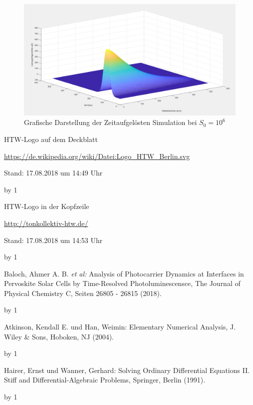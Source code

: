 \documentclass[
	pagesize,
	fontsize=12pt,
	paper=a4,
	oneside,
   reqno
]{scrartcl}
\begin{document}
\begin{figure}[H]
   \centering
   \includegraphics[width=1\textwidth]{Bilder/Aufgabe_4_4_6.png}
   \caption[Lösung bei $S_0 = 10^6$]{Grafische Darstellung der Zeitaufgelösten Simulation bei $S_0 = 10^6$}
   \label{fig:Aufgabe_4_4_6}
\end{figure}

\clearpage

\newpage
\newcount\Quellennummer
{}

\renewcommand\refname{Literaturverzeichnis}

\begin{thebibliography}{999}
{\setlength{\emergencystretch}{3cm}%

HTW-Logo auf dem Deckblatt\par
\url{https://de.wikipedia.org/wiki/Datei:Logo_HTW_Berlin.svg} \par
 Stand: 17.08.2018 um 14:49 Uhr

\advance\Quellennummer by 1
 
HTW-Logo in der Kopfzeile\par
\url{http://tonkollektiv-htw.de/} \par
 Stand: 17.08.2018 um 14:53 Uhr

\advance\Quellennummer by 1

Baloch, Ahmer A. B. \textit{et al:} \glqq Analysis of Photocarrier Dynamics at Interfaces in Pervoskite Solar Cells by Time-Resolved Photoluminescensce\grqq{}, The Journal of Physical Chemistry C, Seiten 26805 - 26815 (2018).

\advance\Quellennummer by 1

Atkinson, Kendall E. und Han, Weimin: \glqq Elementary Numerical Analysis\grqq{}, J. Wiley \& Sons, Hoboken, NJ (2004).

\advance\Quellennummer by 1

Hairer, Ernst und Wanner, Gerhard: \glqq Solving Ordinary Differential Equations II. Stiff and Differential-Algebraic Problems\grqq{}, Springer, Berlin (1991).

\advance\Quellennummer by 1

}
\end{thebibliography}
\end{document}
